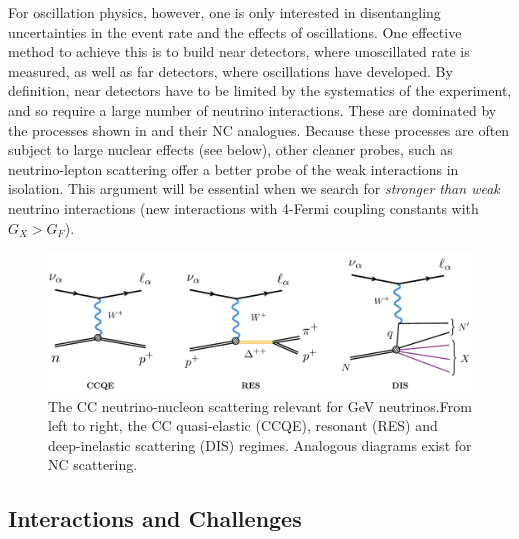 For oscillation physics, however, one is only interested in disentangling uncertainties in the event rate and the effects of oscillations. One effective method to achieve this is to build near detectors, where unoscillated rate is measured, as well as far detectors, where oscillations have developed. By definition, near detectors have to be limited by the systematics of the experiment, and so require a large number of neutrino interactions. These are dominated by the processes shown in  and their NC analogues. Because these processes are often subject to large nuclear effects (see below), other cleaner probes, such as neutrino-lepton scattering offer a better probe of the weak interactions in isolation. This argument will be essential when we search for \emph{stronger than weak} neutrino interactions (new interactions with 4-Fermi coupling constants with $G_X > G_F$). 
%
\begin{figure}[t]
\centering
\includegraphics[width=\textwidth]{interactions.pdf}
  \caption[Neutrino nucleon interactions.]{The CC neutrino-nucleon scattering relevant for GeV neutrinos.From left to right, the CC quasi-elastic (CCQE), resonant (RES) and deep-inelastic scattering (DIS) regimes. Analogous diagrams exist for NC scattering. \label{fig:interactions_diagram}}
\end{figure}
%

\subsection{Interactions and Challenges}

